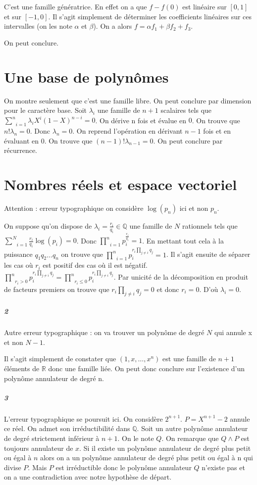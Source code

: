 \documentclass[10pt,a4paper]{article}
\begin{document}
C'est une famille génératrice. En effet on a que $f-f(0)$ est linéaire sur $[0,1]$ et sur $[-1,0]$. Il s'agit simplement de déterminer les coefficients linéaires sur ces intervalles (on les note $\alpha$ et $\beta$). On a alors $f = \alpha f_1 + \beta f_2 +f_3$.

On peut conclure.  

\section{Une base de polynômes}

On montre seulement que c'est une famille libre. On peut conclure par dimension pour le caractère base. Soit $\lambda_i$ une famille de $n+1$ scalaires tels que $\underset{i=1}{\overset{n}{\sum}} \lambda_i X^i(1-X)^{n-i}=0$. On dérive n fois et évalue en $0$. On trouve que $n! \lambda_n=0$. Donc $\lambda_n=0$. On reprend l'opération en dérivant $n-1$ fois et en évaluant en $0$. On trouve que $(n-1)! \lambda_{n-1}=0$. On peut conclure par récurrence.

\section{Nombres réels et espace vectoriel}
Attention : erreur typographique on considère $\log(p_n)$ ici et non $p_n$.

On suppose qu'on dispose de $\lambda_i= \frac{r_i}{q_i} \in \mathbb{Q}$ une famille de $N$ rationnels tels que $\underset{i=1}{\overset{N}{\sum}} \frac{r_i}{q_i} \log( p_i)=0$. Donc $\underset{i=1}{\overset{n}{\prod}} p_i^{\frac{r_i}{q_i}}=1$. En mettant tout cela à la puissance $q_1 q_2 \dots q_n$ on trouve que $\underset{i=1}{\overset{n}{\prod}} p_i^{r_i \underset{j \neq i}{\prod} q_j}=1$. Il s'agit ensuite de séparer les cas où $r_i$ est positif des cas où il est négatif. $\underset{r_i >0}{\overset{n}{\prod}} p_i^{r_i \underset{j \neq i}{\prod} q_j}=\underset{r_i  \le 0}{\overset{n}{\prod}} p_i^{r_i \underset{j \neq i}{\prod} q_j}$. Par unicité de la décomposition en produit de facteurs premiers on trouve que $r_i  \underset{j \neq i}{\prod} q_j=0$ et donc $r_i=0$. D'où $\lambda_i=0$.

\subparagraph{2} Autre erreur typographique : on va trouver un polynôme de degré $N$ qui annule x et non $N-1$.

Il s'agit simplement de constater que $(1,x,\dots,x^n)$ est une famille de $n+1$ éléments de $\mathbb{R}$ donc une famille liée. On peut donc conclure sur l'existence d'un polynôme annulateur de degré n.
\subparagraph{3} L'erreur typographique se poursuit ici. On considère $2^{n+1}$. $P=X^{n+1}-2$ annule ce réel. On admet son irréductibilité dans $\mathbb{Q}$. Soit un autre polynôme annulateur de degré strictement inférieur à $n+1$. On le note $Q$. On remarque que $Q \wedge P$ est toujours annulateur de $x$. Si il existe un polynôme annulateur de degré plus petit ou égal à $n$ alors on a un polynôme annulateur de degré plus petit ou égal à n qui divise $P$. Mais $P$ est irréductible donc le polynôme annulateur $Q$ n'existe pas et on a une contradiction avec notre hypothèse de départ.
\end{document}
